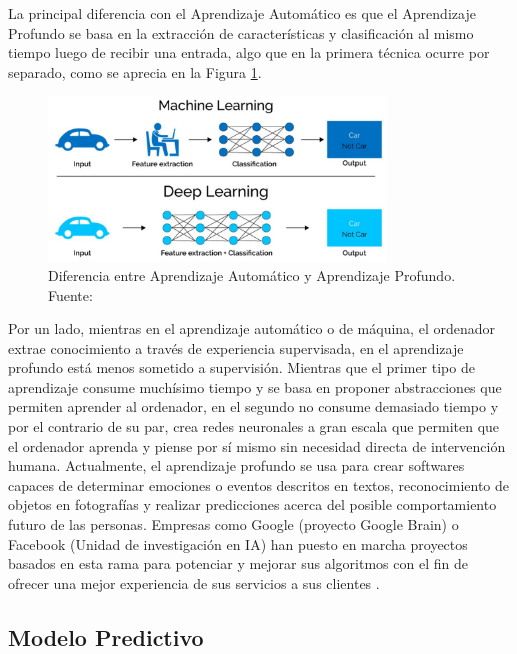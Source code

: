 La principal diferencia con el Aprendizaje Automático es que el Aprendizaje Profundo se basa en la extracción de características y clasificación al mismo tiempo luego de recibir una entrada, algo que en la primera técnica ocurre por separado, como se aprecia en la Figura \ref{2:fig6}.
\begin{figure}[h]
	\begin{center}
		\includegraphics[width=0.8\textwidth]{2/figures/deeplearning_machinelearning.jpg}
		\caption{Diferencia entre Aprendizaje Automático y Aprendizaje Profundo. Fuente: \cite{tec_cook2018deeplearning}}
		\label{2:fig6}
	\end{center}
\end{figure}

Por un lado, mientras en el aprendizaje automático o de máquina, el ordenador extrae conocimiento a través de experiencia supervisada, en el aprendizaje profundo está menos sometido a supervisión. Mientras que el primer tipo de aprendizaje consume muchísimo tiempo y se basa en proponer abstracciones que permiten aprender al ordenador, en el segundo no consume demasiado tiempo y por el contrario de su par, crea redes neuronales a gran escala que permiten que el ordenador aprenda y piense por sí mismo sin necesidad directa de intervención humana. Actualmente, el aprendizaje profundo se usa para crear softwares capaces de determinar emociones o eventos descritos en textos, reconocimiento de objetos en fotografías y realizar predicciones acerca del posible comportamiento futuro de las personas. Empresas como Google (proyecto Google Brain) o Facebook (Unidad de investigación en IA) han puesto en marcha proyectos basados en esta rama para potenciar y mejorar sus algoritmos con el fin de ofrecer una mejor experiencia de sus servicios a sus clientes \parencite{tec_banafa2019deeplearning}.

\subsection{Modelo Predictivo}

